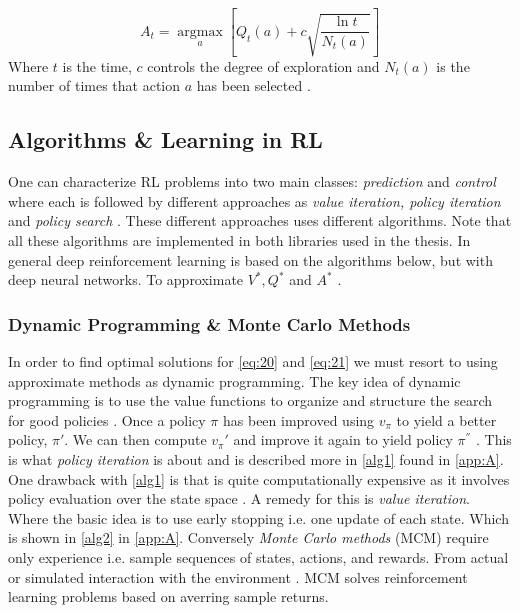 \documentclass{kththesis}
\theoremstyle{definition}
\begin{document}
\begin{equation}
    \label{eq:21c}
    A_t = \underset{a}{\operatorname{argmax}} \left[Q_t(a) + c \sqrt{\frac{\ln{t}}{N_t(a)}} \right]
\end{equation}
Where $t$ is the time, $c$ controls the degree of exploration and $N_t(a)$ is the number of times that action $a$ has been selected \parencite{sutton1998reinforcement}.

\subsection{Algorithms \& Learning in RL}
One can characterize RL problems into two main classes: \textit{prediction} and \textit{control} where each is followed by different approaches as \textit{value iteration, policy iteration} and \textit{policy search} \parencite{szepesvari2009algorithms}. 
\newline
These different approaches uses different algorithms. Note that all these algorithms are implemented in both \parencite{plappert2016kerasrl, baselines} libraries used in the thesis. In general deep reinforcement learning is based on the algorithms below, but with deep neural networks. To approximate $V^{*}, Q^{*}$ and $A^{*}$ \parencite{arulkumaran2017brief}. 

\subsubsection*{Dynamic Programming \& Monte Carlo Methods}
In order to find optimal solutions for \autoref{eq:20} and \autoref{eq:21} we must resort to using approximate methods as dynamic programming. The key idea of dynamic programming is to use the value functions to organize and structure the search for good policies \parencite{sutton1998reinforcement, szepesvari2009algorithms}. Once a policy $\pi$ has been improved using $v_{\pi}$ to yield a better policy,  $\pi'$. We can then compute $v_{\pi}'$ and improve it again to yield policy $\pi^{''}$ \parencite{sutton1998reinforcement}. This is what \textit{policy iteration} is about and is described more in \autoref{alg1} found in \autoref{app:A}.
\newline
\newline
One drawback with \autoref{alg1} is that is quite computationally expensive as it involves policy evaluation over the state space \parencite{sutton1998reinforcement}. A remedy for this is \textit{value iteration}. Where the basic idea is to use early stopping i.e. one update of each state. Which is shown in \autoref{alg2} in \autoref{app:A}. Conversely \textit{Monte Carlo methods} (MCM) require only experience i.e. sample sequences of states, actions, and rewards. From actual or simulated interaction with the environment \parencite{sutton1998reinforcement}. MCM solves reinforcement learning problems based on averring sample returns. 
\end{document}
